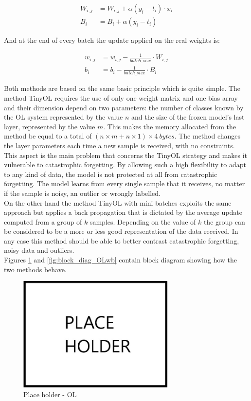 \documentclass[12pt]{report}
\begin{document}
\begin{align}
	W_{i,j} &= W_{i,j} + \alpha (y_i - t_i) \cdot x_i \\
    B_i     &= B_i + \alpha  (y_i - t_i) 
\end{align}

And at the end of every batch the update applied on the real weights is:

\begin{align}
	w_{i,j} &= w_{i,j} - \frac{1}{batch\_size} \cdot W_{i,j} \\
	b_i     &= b_i - \frac{1}{batch\_size} \cdot B_i
\end{align}

Both methods are based on the same basic principle which is quite simple. The method TinyOL requires the use of only one weight matrix and one bias array and their dimension depend on two parameters: the number of classes known by the OL system represented by the value $n$ and the size of the frozen model's last layer, represented by the value $m$. This makes the memory allocated from the method be equal to a total of $(n \times m+n \times 1)\times 4 \: bytes$. The method changes the layer parameters each time a new sample is received, with no constraints. This aspect is the main problem that concerns the TinyOL strategy and makes it vulnerable to catastrophic forgetting. By allowing such a high flexibility to adapt to any kind of data, the model is not protected at all from catastrophic forgetting. The model learns from every single sample that it receives, no matter if the sample is noisy, an outlier or wrongly labelled.\\
On the other hand the method TinyOL with mini batches exploits the same approach but applies a back propagation that is dictated by the average update computed from a group of $k$ samples. Depending on the value of $k$ the group can be considered to be a more or less good representation of the data received. In any case this method should be able to better contrast catastrophic forgetting, noisy data and outliers. \\
Figures \ref{fig:block_diag_OL} and \ref{fig:block_diag_OLwb} contain block diagram showing how the two methods behave.

\begin{figure}[h!]
    \centering
    \includegraphics[width=0.7\textwidth]{Figures/Chapter3/PLACEHOLDER.jpg} 
    \caption{Place holder - OL}
    \label{fig:block_diag_OL}    
\end{figure}
\end{document}
